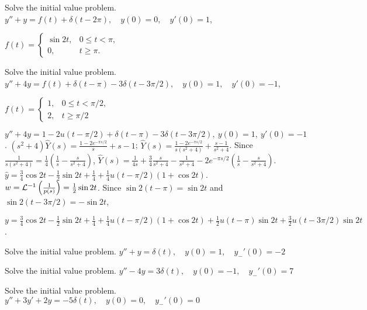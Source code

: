 \documentclass{ximera}
\begin{document}
\begin{problem}\label{exer:8.7.19}
Solve the initial value
problem.
$y''+y=f(t)+\delta(t-2\pi), \quad  y(0)=0,\quad y'(0)=1$, 

$f(t)=\left\{\begin{array}{cl}
\sin2t,&0\le t<\pi,\\0,&t\ge \pi.\end{array}\right.$
\end{problem}

\begin{problem}\label{exer:8.7.20}
Solve the initial value
problem.
$y''+4y=f(t)+\delta(t-\pi)-3\delta(t-3\pi/2), \quad  y(0)=1,\quad
y'(0)=-1$, 

$f(t)=\left\{\begin{array}{cl}1,&0\le t<\pi/2,\\2,&t\ge
\pi/2\end{array}\right.$

\begin{solution}
$y''+4y=1-2u(t-\pi/2)+\delta(t-\pi)-3\delta(t-3\pi/2),\ y(0)=1,\
y'(0)=-1$.
$(s^2+4)\hat Y(s)=\frac{1-2e^{-\pi s/2}}{s}+s-1$;
$\hat Y(s)=\frac{1-2e^{-\pi s/2}}{s(s^2+4)}+\frac{s-1}{s^2+4}$.
Since
$\frac{1}{s(s^2+4)}=
\frac{1}{4}\left(\frac{1}{s}-\frac{s}{s^2+4}\right)$,
$\hat Y(s)=
\frac{1}{4s}+\frac{3}{4}\frac{s}{s^2+4}-\frac{1}{s^2+4}
-2e^{-\pi s/2}\left(\frac{1}{s}-\frac{s}{s^2+4}\right)$.
$\hat
y=\frac{3}{4}\cos2t-\frac{1}{2}\sin2t+\frac{1}{4}+\frac{1}{4}u(t-\pi/2)
(1+\cos2t)$.
$w={\cal L}^{-1}\left(\frac{1}{p(s)}\right)=\frac{1}{2}\sin2t$.
Since $\sin2(t-\pi)=\sin2t$ and $\sin2(t-3\pi/2)=-\sin2t$,

$y=\frac{3}{4}\cos2t-\frac{1}{2}\sin2t+\frac{1}{4}+\frac{1}{4}u(t-\pi/2)
(1+\cos2t)+\frac{1}{2}u(t-\pi)\sin2t+\frac{3}{2}u(t-3\pi/2)\sin2t$.
\end{solution}
\end{problem}

\begin{problem}\label{exer:8.7.21}
Solve the initial value
problem.
$y''+y=\delta(t), \quad  y(0)=1,\quad y_-'(0)=-2$
\end{problem}

\begin{problem}\label{exer:8.7.22}
Solve the initial value
problem.
$y''-4y=3\delta(t), \quad  y(0)=-1,\quad y_-'(0)=7$
\end{problem}

\begin{problem}\label{exer:8.7.23}
Solve the initial value
problem.
$y''+3y'+2y=-5\delta(t), \quad  y(0)=0,\quad y_-'(0)=0$
\end{problem}
\end{document}
